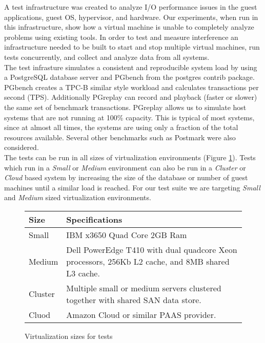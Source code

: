A test infrastructure was created to analyze I/O performance issues in the guest applications, guest OS, hypervisor, and hardware.  Our experiments, when run in this infrastructure, show how a virtual machine is unable to completely analyze problems using existing tools.  In order to test and measure interference an infrastructure needed to be built to start and stop multiple virtual machines, run tests concurrently, and collect and analyze data from all systems.  \\

\indent The test infrasture simulates a consistent and reproducible system load by using a PostgreSQL database server and PGbench from the postgres contrib package. PGbench creates a TPC-B similar style workload and calculates transactions per second (TPS).   Additionally PGreplay can record and playback (faster or slower) the same set of benchmark transactions.  PGreplay allows us to simulate host systems that are not running at 100\% capacity.  This is typical of most systems, since at almost all times, the systems are using only a fraction of the total resources available.  Several other benchmarks such as Postmark \cite{katcher} were also considered. \\

\indent The tests can be run in all sizes of virtualization environments (Figure \ref{fig:virtSize}).  Tests which run in a \emph{Small} or \emph{Medium} environment can also be run in a \emph{Cluster} or \emph{Cloud} based system by increasing the size of the database or number of guest machines until a similar load is reached.  For our test suite we are targeting \emph{Small} and \emph{Medium} sized virtualization environments. \\

\begin{figure}[h!]
\begin{tabular}{ l p{5cm} }
  Size & Specifications \\
  \hline
  Small & IBM x3650 Quad Core 2GB Ram \\
  Medium & Dell PowerEdge T410 with dual quadcore Xeon processors, 256Kb L2 cache, and 8MB shared L3 cache. \\
  Cluster & Multiple small or medium servers clustered together with shared SAN data store. \\
  Cluod & Amazon Cloud or similar PAAS provider. \\
\end{tabular}
\caption{Virtualization sizes for tests}
\label{fig:virtSize}
\end{figure}

